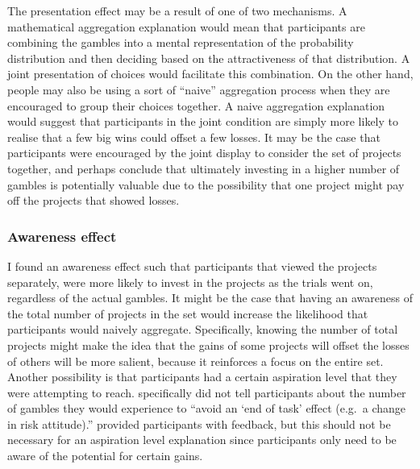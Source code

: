\documentclass[a4paper, nobind, dvipsnames]{templates/ociamthesis}
\theoremstyle{definition}
\theoremstyle{definition}
\theoremstyle{definition}
\theoremstyle{definition}
\theoremstyle{remark}
\begin{document}
The presentation effect may be a result of one of two mechanisms. A mathematical
aggregation explanation would mean that participants are combining the gambles
into a mental representation of the probability distribution and then deciding
based on the attractiveness of that distribution. A joint presentation of
choices would facilitate this combination. On the other hand, people may also be
using a sort of ``naive'' aggregation process when they are encouraged to group
their choices together. A naive aggregation explanation would suggest that
participants in the joint condition are simply more likely to realise that a few
big wins could offset a few losses. It may be the case that participants were
encouraged by the joint display to consider the set of projects together, and
perhaps conclude that ultimately investing in a higher number of gambles is
potentially valuable due to the possibility that one project might pay off the
projects that showed losses.

\subsubsection{Awareness effect}

I found an awareness effect such that participants that viewed the projects
separately, were more likely to invest in the projects as the trials went on,
regardless of the actual gambles. It might be the case that having an awareness
of the total number of projects in the set would increase the likelihood that
participants would naively aggregate. Specifically, knowing the number of total
projects might make the idea that the gains of some projects will offset the
losses of others will be more salient, because it reinforces a focus on the
entire set. Another possibility is that participants had a certain aspiration
level \autocite{lopes1996} that they were attempting to reach. \textcite[p.~219]{barron2003}
specifically did not tell participants about the number of gambles they would
experience to ``avoid an `end of task' effect (e.g.~a change in risk attitude).''
\textcite{barron2003} provided participants with feedback, but this should not be
necessary for an aspiration level explanation since participants only need to be
aware of the potential for certain gains.
\end{document}
